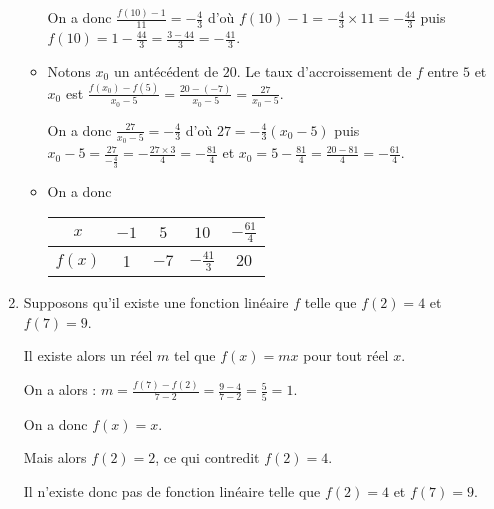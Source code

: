 \begin{exr}
\begin{enumerate}
\begin{itemize}
On a  donc  $\frac{f(10)-1}{11}=-\frac43$ d'où $f(10)-1=-\frac{4}{3}\times11=-\frac{44}{3}$ puis $f(10)=1-\frac{44}{3}=\frac{3-44}{3}=-\frac{41}{3}$.
  \item   Notons $x_0$ un antécédent de $20$. Le taux d'accroissement de $f$ entre $5$ et $x_0$ est $\frac{f(x_0)-f(5)}{x_0-5}=\frac{20-(-7)}{x_0-5}=\frac{27}{x_0-5}$.
  
  On a donc $\frac{27}{x_0-5}=-\frac43$ d'où $27=-\frac43(x_0-5)$ puis $x_0-5=\frac{27}{-\frac43}=-\frac{27\times3}{4}=-\frac{81}{4}$ et $x_0=5-\frac{81}{4}=\frac{20-81}{4}=-\frac{61}{4}$.
  \item On a donc 
    \renewcommand{\arraystretch}{1.75}
    \begin{tabular}{|c|c|c|c|c|}\hline
    $x$ & $-1$ & $5$ & $10$ & $-\frac{61}{4}$ \\ \hline
    $f(x)$ &1 &$ -7$&$-\frac{41}{3}$ & $20$ \\ \hline
    \end{tabular}  
  \end{itemize}
  \item Supposons qu'il existe une fonction linéaire $f$ telle que $f(2) = 4$ et $f(7) = 9$.
  
  Il existe alors un réel $m$ tel que $f(x)=mx$ pour tout réel $x$.
  
  On a alors : $m=\frac{f(7)-f(2)}{7-2}=\frac{9-4}{7-2}=\frac55=1$.
  
  On a donc $f(x)=x$.
  
  Mais alors $f(2)=2$, ce qui contredit $f(2)=4$.
  
  Il n'existe donc pas de fonction linéaire telle que $f(2) = 4$ et $f(7) = 9$.
  \end{enumerate}
\end{exr}
%
%
%
